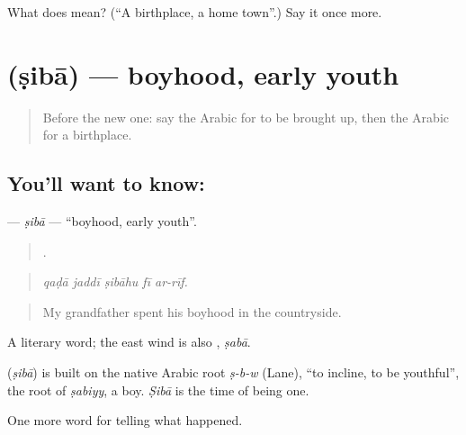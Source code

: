 \begin{tcolorbox}[breakable,colback=teal!4,colframe=teal!35!black,title={Before you move on}]
What does   mean? (\textquotedblleft{}A birthplace, a home town\textquotedblright{}.) Say it once more.
\end{tcolorbox}
\section[\texorpdfstring{\ar{صبا} (ṣibā)}{صبا (ṣibā)}]{ (ṣibā) — boyhood, early youth}

\label{lesson:AR-C323-siba}



\begin{quote}
Before the new one: say the Arabic for to be brought up, then the Arabic for a birthplace.
\end{quote}

\subsection*{You'll want to know: }
\textbf{} — \emph{ṣibā} — \textquotedblleft{}boyhood, early youth\textquotedblright{}.

\begin{quote}
    .
\end{quote}

\begin{quote}
\emph{qaḍā jaddī ṣibāhu fī ar-rīf.}
\end{quote}

\begin{quote}
My grandfather spent his boyhood in the countryside.
\end{quote}

A literary word; the east wind is also , \emph{ṣabā}.

\begin{cousinweb}
\textbf{} (\emph{ṣibā}) is built on the native Arabic root \emph{ṣ-b-w} (Lane), \textquotedblleft{}to incline, to be youthful\textquotedblright{}, the root of \emph{ṣabiyy}, a boy. \emph{Ṣibā} is the time of being one.
\end{cousinweb}

\begin{grammarlens}[title={What you've built}]
One more word for telling what happened.
\end{grammarlens}

